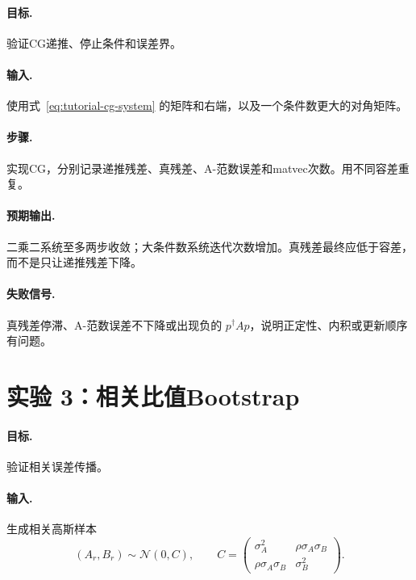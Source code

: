 \documentclass[UTF8,12pt,a4paper,twoside,openany]{ctexbook}
\begin{document}
\paragraph{目标.} 验证CG递推、停止条件和误差界。

\paragraph{输入.} 使用式~\eqref{eq:tutorial-cg-system} 的矩阵和右端，以及一个条件数更大的对角矩阵。

\paragraph{步骤.} 实现CG，分别记录递推残差、真残差、A-范数误差和matvec次数。用不同容差重复。

\paragraph{预期输出.} 二乘二系统至多两步收敛；大条件数系统迭代次数增加。真残差最终应低于容差，而不是只让递推残差下降。

\paragraph{失败信号.} 真残差停滞、A-范数误差不下降或出现负的 \(p^\dagger Ap\)，说明正定性、内积或更新顺序有问题。

\section{实验 3：相关比值Bootstrap}

\paragraph{目标.} 验证相关误差传播。

\paragraph{输入.} 生成相关高斯样本
\begin{equation}
  (A_r,B_r)\sim\mathcal N(0,C),
  \qquad
  C=\begin{pmatrix}\sigma_A^2&\rho\sigma_A\sigma_B\\
  \rho\sigma_A\sigma_B&\sigma_B^2\end{pmatrix}.
  \label{eq:lab-correlated-sample}
\end{equation}
\end{document}
